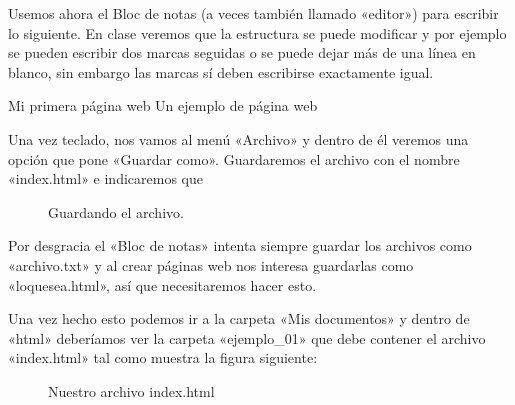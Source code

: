 \documentclass[letterpaper,10pt,spanish]{sphinxmanual}
\begin{document}
Usemos ahora el Bloc de notas (a veces también llamado «editor») para escribir lo siguiente. En clase veremos que la estructura se puede modificar y por ejemplo se pueden escribir dos marcas seguidas o se puede dejar más de una línea en blanco, sin embargo las marcas sí deben escribirse exactamente igual.

%
\begin{sphinxVerbatim}[commandchars=\\\{\}]
         Mi primera página web
     Un ejemplo de página web
\end{sphinxVerbatim}

Una vez teclado, nos vamos al menú «Archivo» y dentro de él veremos una opción que pone «Guardar como». Guardaremos el archivo con el nombre «index.html» e indicaremos que 

\begin{figure}[htbp]
\centering
\capstart

\noindent{}
\caption{Guardando el archivo.}\label{\detokenize{index:id5}}\end{figure}

Por desgracia el «Bloc de notas» intenta siempre guardar los archivos como «archivo.txt» y al crear páginas web nos interesa guardarlas como «loquesea.html», así que necesitaremos hacer esto.

Una vez hecho esto podemos ir a la carpeta «Mis documentos» y dentro de «html» deberíamos ver la carpeta «ejemplo\_01» que debe contener el archivo «index.html» tal como muestra la figura siguiente:

\begin{figure}[htbp]
\centering
\capstart

\noindent{}
\caption{Nuestro archivo index.html}\label{\detokenize{index:id6}}\end{figure}
\end{document}
